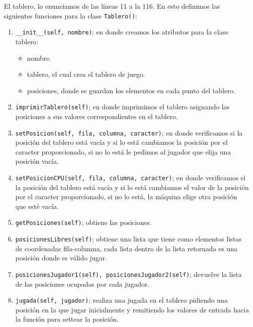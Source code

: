 	El tablero, lo enunciamos de las líneas 11 a la 116. En esto definimos las siguientes funciones para la clase \texttt{Tablero()}:
	
	\begin{enumerate}
		\item \texttt{\_\_init\_\_(self, nombre)}; en donde creamos los atributos para la clase tablero:
		\begin{itemize}
			\item nombre.
			\item tablero, el cual crea el tablero de juego.
			\item posiciones, donde se guardan los elementos en cada punto del tablero.
		\end{itemize}
		
		\item \texttt{imprimirTablero(self)}; en donde imprimimos el tablero asignando las posiciones a sus valores correspondientes en el tablero.
		
		\item \texttt{setPosicion(self, fila, columna, caracter)}; en donde verificamos si la posición del tablero está vacía y si lo está cambiamos la posición por el caracter proporcionado, si no lo está le pedimos al jugador que elija una posición vacía.
		
		\item \texttt{setPosicionCPU(self, fila, columna, caracter)}; en donde verificamos si la posición del tablero está vacía y si lo está cambiamos el valor de la posición por el caracter proporcionado, si no lo está, la máquina elige otra posición que esté vacía.
		
		\item \texttt{getPosiciones(self)}; obtiene las posiciones.
		
		\item \texttt{posicionesLibres(self)}; obtiene una lista que tiene como elementos listas de coordenadas fila-columna, cada lista dentro de la lista retornada es una posición donde es válido jugar.
		
		\item \texttt{posicionesJugador1(self), posicionesJugador2(self)}; devuelve la lista de las posiciones ocupadas por cada jugador.
		
		\item \texttt{jugada(self, jugador)}; realiza una jugada en el tablero pidiendo una posición en la que jugar inicialmente y remitiendo los valores de entrada hacia la función para settear la posición.
		

\end{enumerate}
